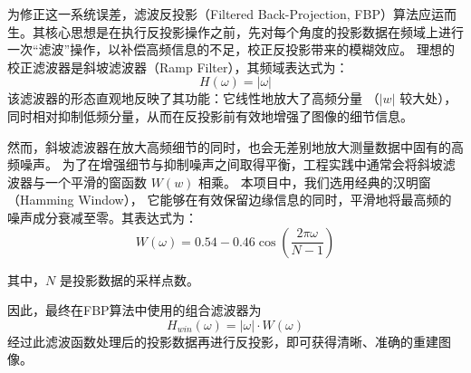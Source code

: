 为修正这一系统误差，滤波反投影（Filtered Back-Projection, FBP）算法应运而生。其核心思想是在执行反投影操作之前，先对每个角度的投影数据在频域上进行一次“滤波”操作，以补偿高频信息的不足，校正反投影带来的模糊效应。
理想的校正滤波器是斜坡滤波器（Ramp Filter），其频域表达式为：
\begin{equation*}
    H(\omega)=|\omega|
\end{equation*}
该滤波器的形态直观地反映了其功能：它线性地放大了高频分量 （$|w|$ 较大处），
同时相对抑制低频分量，从而在反投影前有效地增强了图像的细节信息。
\par

然而，斜坡滤波器在放大高频细节的同时，也会无差别地放大测量数据中固有的高频噪声。
为了在增强细节与抑制噪声之间取得平衡，工程实践中通常会将斜坡滤波器与一个平滑的窗函数 $W(w)$ 相乘。
本项目中，我们选用经典的汉明窗（Hamming Window），
它能够在有效保留边缘信息的同时，平滑地将最高频的噪声成分衰减至零。其表达式为：
\begin{equation*}
    W(\omega) = 0.54 - 0.46 \cos(\frac{2\pi \omega}{N-1})
\end{equation*}

其中，$N$ 是投影数据的采样点数。\par
因此，最终在FBP算法中使用的组合滤波器为 
\begin{equation*}
H_{win}(\omega)=|\omega|\cdot W(\omega)
\end{equation*}
经过此滤波函数处理后的投影数据再进行反投影，即可获得清晰、准确的重建图像。





